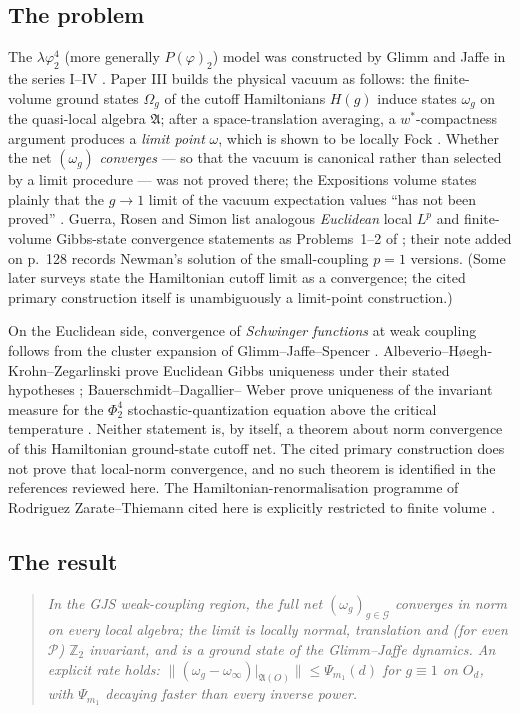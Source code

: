 \documentclass[11pt,a4paper]{article}
\theoremstyle{plain}
\theoremstyle{definition}
\newcommand{\Z}{\mathbb{Z}}
\newcommand{\A}{\mathfrak{A}}
\newcommand{\G}{\mathcal{G}}
\newcommand{\Om}{\Omega}
\begin{document}
\subsection{The problem}

The $\lambda\varphi^4_2$ (more generally $P(\varphi)_2$) model was constructed by Glimm and
Jaffe in the series I--IV \cite{GJ1,GJ2,GJ3,GJ4}. Paper III builds the physical vacuum as
follows: the finite-volume ground states $\Om_g$ of the cutoff Hamiltonians $H(g)$ induce states
$\omega_g$ on the quasi-local algebra $\A$; after a space-translation averaging, a $w^*$-compactness
argument produces a \emph{limit point} $\omega$, which is shown to be locally Fock
\cite[Thms.~2.1--2.3]{GJ3}. Whether the net $(\omega_g)$ \emph{converges} --- so that the vacuum
is canonical rather than selected by a limit procedure --- was not proved there; the Expositions volume states plainly that
the $g\to1$ limit of the vacuum expectation values ``has not been proved''
\cite[\S4]{GJExp}. Guerra, Rosen and Simon list analogous \emph{Euclidean} local $L^p$ and
finite-volume Gibbs-state convergence statements as Problems~1--2 of \cite[pp.~125--126]{GRS75};
their note added on p.~128 records Newman's solution of the small-coupling $p=1$ versions.
(Some later surveys state the Hamiltonian cutoff limit as a convergence; the cited primary
construction itself is unambiguously a limit-point construction.)

On the Euclidean side, convergence of \emph{Schwinger functions} at weak coupling follows from
the cluster expansion of Glimm--Jaffe--Spencer \cite{GJS}. Albeverio--H\o egh-Krohn--Zegarlinski
prove Euclidean Gibbs uniqueness under their stated hypotheses \cite{AHZ}; Bauerschmidt--Dagallier--
Weber prove uniqueness of the invariant measure for the $\Phi^4_2$ stochastic-quantization
equation above the critical temperature \cite{BDW}. Neither statement is, by itself, a theorem
about norm convergence of this Hamiltonian ground-state cutoff net. The cited primary
construction does not prove that local-norm convergence, and no such theorem is identified in
the references reviewed here. The Hamiltonian-renormalisation programme of Rodriguez
Zarate--Thiemann cited here is explicitly restricted to finite volume \cite{RZT}.

\subsection{The result}

\begin{quote}
\emph{In the GJS weak-coupling region, the full net $(\omega_g)_{g\in\G}$ converges in norm on
every local algebra; the limit is locally normal, translation and (for even $\mathscr P$)
$\Z_2$ invariant, and is a ground state of the Glimm--Jaffe dynamics. An explicit rate holds:
$\|(\omega_g-\omega_\infty)|_{\A(O)}\|\le\Psi_{m_1}(d)$ for $g\equiv1$ on $O_d$, with
$\Psi_{m_1}$ decaying faster than every inverse power.}
\end{quote}
\end{document}
